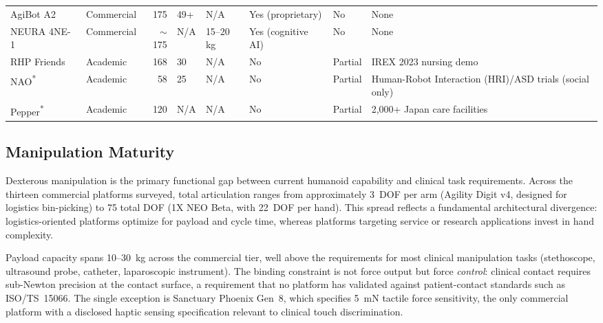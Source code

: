 \begin{table}[t]
{\begin{tabular}{@{}llrlllll@{}}
    AgiBot A2~\cite{agibot2025a2}        & Commercial & 175 & 49+            & N/A        & Yes (proprietary)     & No      & None \\
    NEURA 4NE-1~\cite{neura2025_4ne1}      & Commercial & $\sim$175 & N/A      & 15--20\,kg & Yes (cognitive AI)   & No      & None \\
    RHP Friends      & Academic   & 168 & 30             & N/A        & No                    & Partial & IREX 2023 nursing demo~\cite{benallegue2025rhp} \\
    NAO\textsuperscript{*} & Academic & 58 & 25         & N/A   & No                    & Partial & Human-Robot Interaction (HRI)/ASD trials (social only) \\
    Pepper\textsuperscript{*} & Academic & 120 & N/A   & N/A        & No                    & Partial & 2,000+ Japan care facilities \\
    \bottomrule
  \end{tabular}%
  }
\end{table}

\subsection{Manipulation Maturity}
\label{sec:manipmaturity}

Dexterous manipulation is the primary functional gap between current humanoid
capability and clinical task requirements. Across the thirteen commercial platforms
surveyed, total articulation ranges from approximately 3~DOF per arm (Agility
Digit v4, designed for logistics bin-picking) to 75 total DOF (1X NEO Beta, with
22~DOF per hand). This spread reflects a fundamental architectural divergence:
logistics-oriented platforms optimize for payload and cycle time, whereas
platforms targeting service or research applications invest in hand complexity.

Payload capacity spans 10--30~kg across the commercial tier, well above the
requirements for most clinical manipulation tasks (stethoscope, ultrasound probe,
catheter, laparoscopic instrument). The binding constraint is not force output
but force \emph{control}: clinical contact requires sub-Newton precision at the
contact surface, a requirement that no platform has validated against patient-contact
standards such as ISO/TS~15066. The single exception is Sanctuary Phoenix Gen~8,
which specifies 5~mN tactile force sensitivity, the only commercial platform with
a disclosed haptic sensing specification relevant to clinical touch discrimination.

